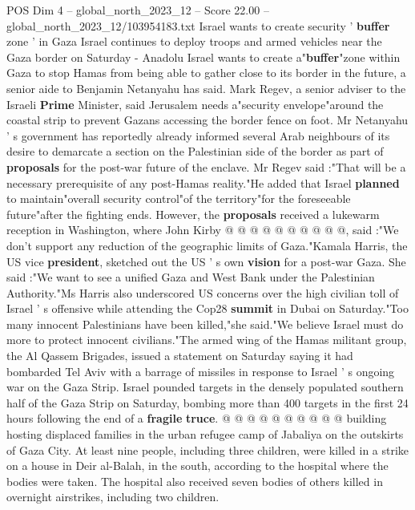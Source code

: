 \begin{textsample}{POS Dim 4 – global\_north\_2023\_12 – Score 22.00 – global\_north\_2023\_12/103954183.txt}  \label{ex:f4_pos_302}
Israel wants to create security ' \textbf{buffer} zone ' in Gaza Israel continues to deploy troops and armed vehicles near the Gaza border on Saturday - Anadolu Israel wants to create a"\textbf{buffer}"zone within Gaza to stop Hamas from being able to gather close to its border in the future, a senior aide to Benjamin Netanyahu has said.
Mark Regev, a senior adviser to the Israeli \textbf{Prime} Minister, said Jerusalem needs a"security envelope"around the coastal strip to prevent Gazans accessing the border fence on foot.
Mr Netanyahu ' s government has reportedly already informed several Arab neighbours of its desire to demarcate a section on the Palestinian side of the border as part of \textbf{proposals} for the post-war future of the enclave.
Mr Regev said :"That will be a necessary prerequisite of any post-Hamas reality."He added that Israel \textbf{planned} to maintain"overall security control"of the territory"for the foreseeable future"after the fighting ends.
However, the \textbf{proposals} received a lukewarm reception in Washington, where John Kirby @ @ @ @ @ @ @ @ @ @, said :"We don't support any reduction of the geographic limits of Gaza."Kamala Harris, the US vice \textbf{president}, sketched out the US ' s own \textbf{vision} for a post-war Gaza.
She said :"We want to see a unified Gaza and West Bank under the Palestinian Authority."Ms Harris also underscored US concerns over the high civilian toll of Israel ' s offensive while attending the Cop28 \textbf{summit} in Dubai on Saturday."Too many innocent Palestinians have been killed,"she said."We believe Israel must do more to protect innocent civilians."The armed wing of the Hamas militant group, the Al Qassem Brigades, issued a statement on Saturday saying it had bombarded Tel Aviv with a barrage of missiles in response to Israel ' s ongoing war on the Gaza Strip.
Israel pounded targets in the densely populated southern half of the Gaza Strip on Saturday, bombing more than 400 targets in the first 24 hours following the end of a \textbf{fragile} \textbf{truce}. @ @ @ @ @ @ @ @ @ @ building hosting displaced families in the urban refugee camp of Jabaliya on the outskirts of Gaza City.
At least nine people, including three children, were killed in a strike on a house in Deir al-Balah, in the south, according to the hospital where the bodies were taken.
The hospital also received seven bodies of others killed in overnight airstrikes, including two children.

\end{textsample}

